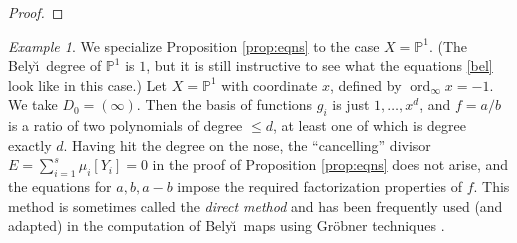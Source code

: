 \documentclass{amsproc}
\numberwithin{equation}{section}
\numberwithin{figure}{section}
\theoremstyle{definition}
\theoremstyle{remark}
\newtheorem{example}[equation]{Example}
\DeclareMathOperator{\ord}{ord}
\DeclareMathOperator{\opdiv}{div}
\newcommand{\Qbar}{\overline{\mathbb{Q}}}
\newcommand{\scrL}{\mathscr{L}}
\newcommand\PP{\mathbb{P}}
\newcommand\Hzero{\mathrm{H}^0}
\DeclareMathOperator{\Bel}{Bel}
\renewcommand{\leq}{\leqslant}
\newcommand{\Belyi}{Bely\u{\i}}
\begin{document}
\begin{proof}
\end{proof}

\begin{example} 
We specialize Proposition \ref{prop:eqns} to the case $X = \PP^1$. 
(The \Belyi\ degree of $\PP^1$ is $1$, but it is still instructive to see what the equations \eqref{bel} look like in this case.)  Let $X=\PP^1$ with coordinate $x$, defined by $\ord_\infty x = -1$.  We take $D_0=(\infty)$.  Then the basis of functions $g_i$ is just $1,\dots,x^d$, and $f=a/b$ is a ratio of two polynomials of degree $\leq d$, at least one of which is degree exactly $d$.  Having hit the degree on the nose, the ``cancelling'' divisor $E=\sum_{i=1}^s \mu_i[Y_i]=0$ in the proof of Proposition \ref{prop:eqns} does not arise, and the equations for $a,b,a-b$ impose the required factorization properties of $f$.  This method is sometimes called the \emph{direct method} and has been frequently used (and adapted) in the computation of \Belyi\ maps using Gr\"obner techniques \cite[\S 2]{SijslingVoight}.
\end{example}
\end{document}
